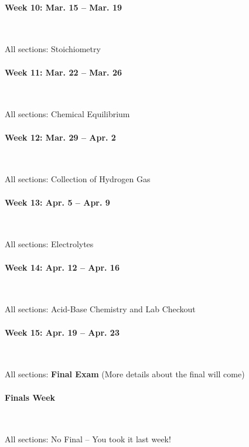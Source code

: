 \documentclass[12pt, letterpaper]{article}
\begin{document}
\paragraph{Week 10: Mar. 15 -- Mar. 19}~

All sections: Stoichiometry

\paragraph{Week 11: Mar. 22 -- Mar. 26}~

All sections: Chemical Equilibrium

\paragraph{Week 12: Mar. 29 -- Apr. 2}~ 

All sections: Collection of Hydrogen Gas

\paragraph{Week 13: Apr. 5 -- Apr. 9}~

All sections: Electrolytes

\paragraph{Week 14: Apr. 12 -- Apr. 16}~

All sections: Acid-Base Chemistry and Lab Checkout

\paragraph{Week 15: Apr. 19 -- Apr. 23}~

All sections: \textbf{Final Exam} (More details about the final will come)

\paragraph{Finals Week}~

All sections: No Final -- You took it last week!
\end{document}
